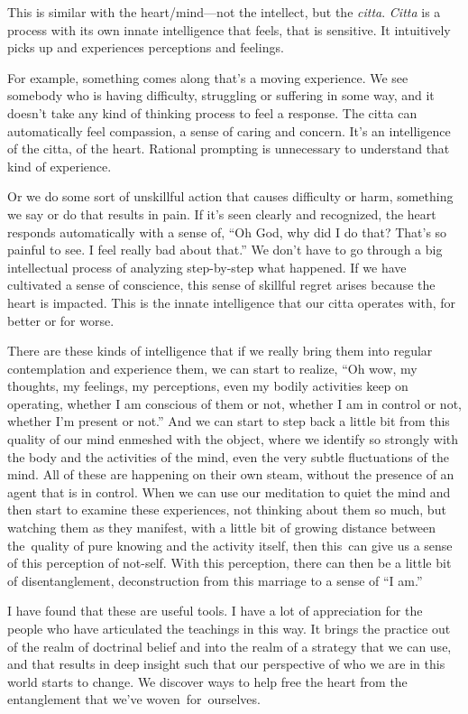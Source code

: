 This is similar with the heart/mind---not the intellect, but the \emph{citta}. \emph{Citta} is a process with its own innate intelligence that feels, that is sensitive. It intuitively picks up and experiences perceptions and feelings.

For example, something comes along that's a moving experience. We see somebody who is having difficulty, struggling or suffering in some way, and it doesn't take any kind of thinking process to feel a response. The citta can automatically feel compassion, a sense of caring and concern. It's an intelligence of the citta, of the heart. Rational prompting is unnecessary to understand that kind of experience.

Or we do some sort of unskillful action that causes difficulty or harm, something we say or do that results in pain. If it's seen clearly and recognized, the heart responds automatically with a sense of, ``Oh God, why did I do that? That's so painful to see. I feel really bad about that.'' We don't have to go through a big intellectual process of analyzing step-by-step what happened. If we have cultivated a sense of conscience, this sense of skillful regret arises because the heart is impacted. This is the innate intelligence that our citta operates with, for better or for worse.

There are these kinds of intelligence that if we really bring them into regular contemplation and experience them, we can start to realize, ``Oh wow, my thoughts, my feelings, my perceptions, even my bodily activities keep on operating, whether I am conscious of them or not, whether I am in control or not, whether I'm present or not.'' And we can start to step back a little bit from this quality of our mind enmeshed with the object, where we identify so strongly with the body and the activities of the mind, even the very subtle fluctuations of the mind. All of these are happening on their own steam, without the presence of an agent that is in control. When we can use our meditation to quiet the mind and then start to examine these experiences, not thinking about them so much, but watching them as they manifest, with a little bit of growing distance between \mbox{the quality} of pure knowing and the activity itself, then \mbox{this can} give us a sense of this perception of not-self. With this perception, there can then be a little bit of disentanglement, deconstruction from this marriage to a sense of ``I am.''

I have found that these are useful tools. I have a lot of appreciation for the people who have articulated the teachings in this way. It brings the practice out of the realm of doctrinal belief and into the realm of a strategy that we can use, and that results in deep insight such that our perspective of who we are in this world starts to change. We discover ways to help free the heart from the entanglement that we've \mbox{woven for ourselves.}

